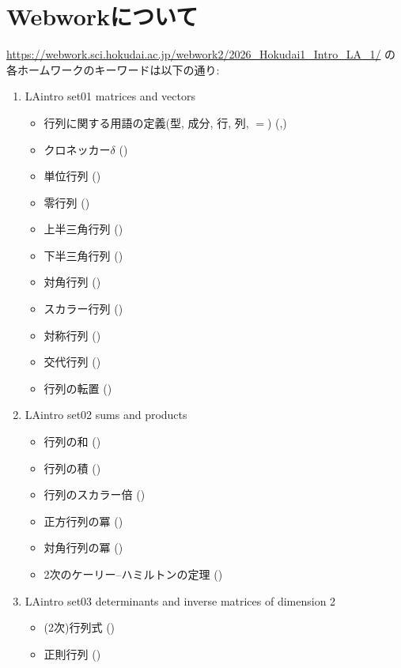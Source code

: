 \section{Webworkについて}
\url{https://webwork.sci.hokudai.ac.jp/webwork2/2026_Hokudai1_Intro_LA_1/}
の各ホームワークのキーワードは以下の通り:
\begin{enumerate}
\item
  LAintro set01 matrices and vectors
  \begin{itemize}
  \item 行列に関する用語の定義(型, 成分, 行, 列, $=$)
    (,)
  \item クロネッカー$\delta$ ()
  \item 単位行列 ()
  \item 零行列 ()
  \item 上半三角行列 ()
  \item 下半三角行列 ()
  \item 対角行列 ()
  \item スカラー行列 ()
  \item 対称行列 ()
  \item 交代行列 ()
  \item 行列の転置 ()
  \end{itemize}
\item
  LAintro set02 sums and products
  \begin{itemize}
  \item 行列の和 ()
  \item 行列の積 ()
  \item 行列のスカラー倍 ()
  \item 正方行列の冪 ()
  \item 対角行列の冪 ()
  \item 2次のケーリー--ハミルトンの定理 ()
  \end{itemize}
\item
  LAintro set03 determinants and inverse matrices of dimension 2
  \begin{itemize}
  \item (2次)行列式 ()
  \item 正則行列 ()

\end{itemize}
\end{enumerate}
